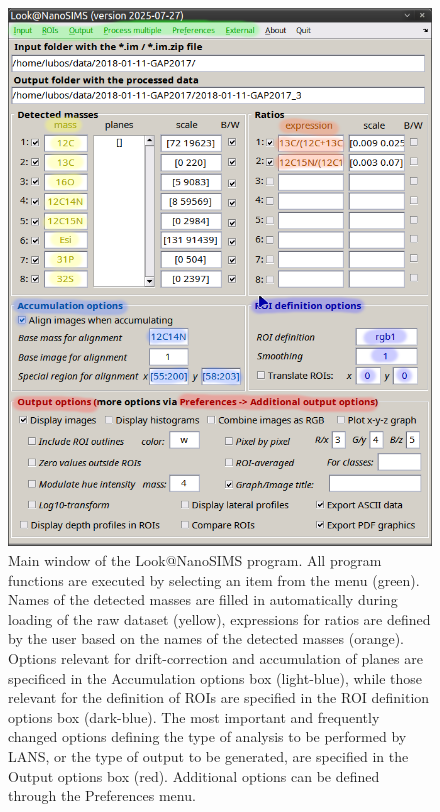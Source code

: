 \begin{figure}[!tp]
\centering
\includegraphics[scale=0.51]{figs1/LANS-maingui}
\caption{\label{fig1:mainLANSgui}%
Main window of the Look@NanoSIMS program. All program functions are executed by selecting an item from the menu (green). Names of the detected \textsf{masses} are filled in automatically during loading of the raw dataset (yellow), \textsf{expressions} for ratios are defined by the user based on the names of the detected masses (orange). Options relevant for drift-correction and accumulation of planes are specificed in the \textsf{Accumulation options} box (light-blue), while those relevant for the definition of ROIs are specified in the \textsf{ROI definition options} box (dark-blue). The most important and frequently changed options defining the {type of analysis} to be performed by LANS, or the {type of output} to be generated, are specified in the \textsf{Output options} box (red). Additional options can be defined through the \textsf{Preferences} menu.}
\end{figure}


